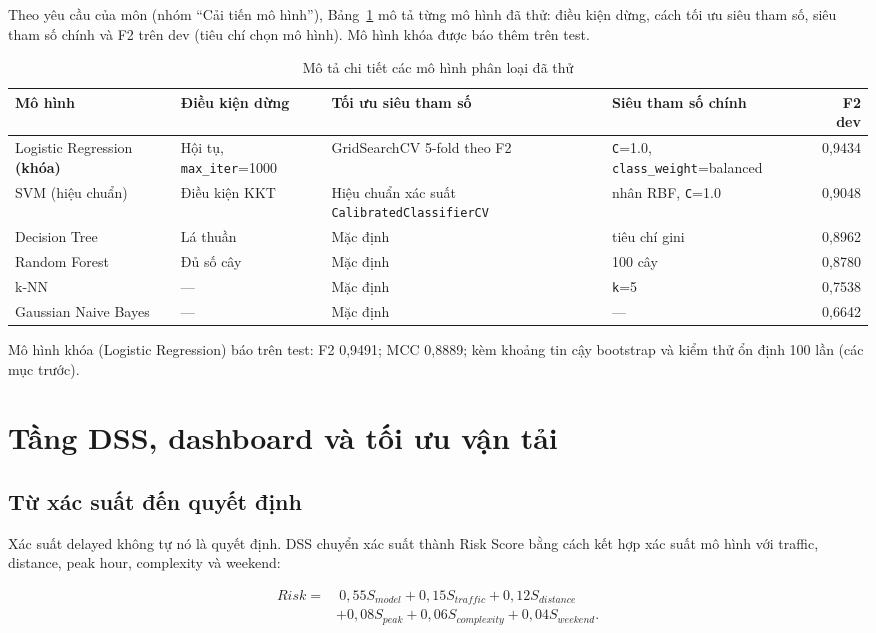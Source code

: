 \documentclass[12pt,a4paper,oneside]{report}
\renewcommand{\arraystretch}{1.18}
\newcommand{\code}[1]{\nolinkurl{#1}}
\begin{document}
Theo yêu cầu của môn (nhóm ``Cải tiến mô hình''), Bảng~\ref{tab:modeldetail} mô
tả từng mô hình đã thử: điều kiện dừng, cách tối ưu siêu tham số, siêu tham số
chính và F2 trên dev (tiêu chí chọn mô hình). Mô hình khóa được báo thêm trên test.

\begin{table}[H]
\centering\scriptsize
\renewcommand{\arraystretch}{1.3}
\caption{Mô tả chi tiết các mô hình phân loại đã thử}
\label{tab:modeldetail}
\begin{tabularx}{\textwidth}{p{2.4cm}p{2.0cm}p{3.0cm}Xr}
\toprule
Mô hình & Điều kiện dừng & Tối ưu siêu tham số & Siêu tham số chính & F2 dev\\
\midrule
Logistic Regression \textbf{(khóa)} & Hội tụ, \code{max\_iter}=1000 & GridSearchCV 5-fold theo F2 & \code{C}=1.0, \code{class\_weight}=balanced & 0,9434\\
SVM (hiệu chuẩn) & Điều kiện KKT & Hiệu chuẩn xác suất \code{CalibratedClassifierCV} & nhân RBF, \code{C}=1.0 & 0,9048\\
Decision Tree & Lá thuần & Mặc định & tiêu chí gini & 0,8962\\
Random Forest & Đủ số cây & Mặc định & 100 cây & 0,8780\\
k-NN & --- & Mặc định & \code{k}=5 & 0,7538\\
Gaussian Naive Bayes & --- & Mặc định & --- & 0,6642\\
\bottomrule
\end{tabularx}
\end{table}

Mô hình khóa (Logistic Regression) báo trên test: F2 0,9491; MCC 0,8889; kèm
khoảng tin cậy bootstrap và kiểm thử ổn định 100 lần (các mục trước).

\chapter{Tầng DSS, dashboard và tối ưu vận tải}

\section{Từ xác suất đến quyết định}

Xác suất delayed không tự nó là quyết định. DSS chuyển xác suất thành Risk
Score bằng cách kết hợp xác suất mô hình với traffic, distance, peak hour,
complexity và weekend:

\[
\begin{aligned}
Risk =&\ 0,55S_{model} + 0,15S_{traffic} + 0,12S_{distance}\\
&+ 0,08S_{peak} + 0,06S_{complexity} + 0,04S_{weekend}.
\end{aligned}
\]
\end{document}
